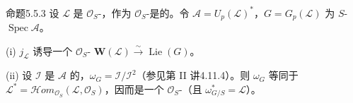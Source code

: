 \begin{SGAresult}{命题}{5.5.3}
设 $\mathcal L$ 是 $\mathcal O_S$-，作为 $\mathcal O_S$-是的。令 $\mathcal A=U_p(\mathcal L)^*$，$G=G_p(\mathcal L)$ 为 $S$- $\operatorname{Spec}\mathcal A$。

(i) $j_{\mathcal L}$ 诱导一个 $\mathcal O_S$- $\mathbf W(\mathcal L)\xrightarrow{\sim}\operatorname{Lie}(G)$。

(ii) 设 $\mathcal I$ 是 $\mathcal A$ 的，$\omega_G=\mathcal I/\mathcal I^2$（参见第 II 讲4.11.4）。则 $\omega_G$ 等同于
$\mathcal L^*=\mathcal Hom_{\mathcal O_S}(\mathcal L,\mathcal O_S)$，因而是一个 $\mathcal O_S$-（且 $\omega_{G/S}^*=\mathcal L$）。
\end{SGAresult}
